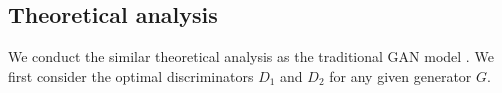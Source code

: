 \documentclass[sigconf]{acmart}
\theoremstyle{definition}
\begin{document}



\subsection{Theoretical analysis}

We conduct the similar theoretical analysis as the traditional GAN model \cite{Goodfellow2014Generative}. We first consider the optimal discriminators $D_1$ and $D_2$ for any given generator $G$.
\end{document}
